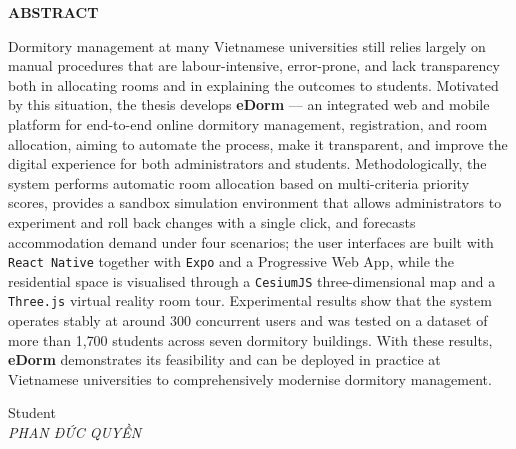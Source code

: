 \documentclass[../DoAn.tex]{subfiles}
\begin{document}
\begin{center}
    {\bfseries\fontsize{18pt}{22pt}\selectfont ABSTRACT}
\end{center}
\vspace{1.5cm}

Dormitory management at many Vietnamese universities still relies largely on
manual procedures that are labour-intensive, error-prone, and lack transparency
both in allocating rooms and in explaining the outcomes to students. Motivated by
this situation, the thesis develops \textbf{eDorm} --- an integrated web and
mobile platform for end-to-end online dormitory management, registration, and
room allocation, aiming to automate the process, make it transparent, and improve
the digital experience for both administrators and students. Methodologically, the
system performs automatic room allocation based on multi-criteria priority scores,
provides a sandbox simulation environment that allows administrators to experiment
and roll back changes with a single click, and forecasts accommodation demand
under four scenarios; the user interfaces are built with \texttt{React Native}
together with \texttt{Expo} and a Progressive Web App, while the residential space
is visualised through a \texttt{CesiumJS} three-dimensional map and a
\texttt{Three.js} virtual reality room tour. Experimental results show that the
system operates stably at around 300 concurrent users and was tested on a dataset
of more than 1{,}700 students across seven dormitory buildings. With these results,
\textbf{eDorm} demonstrates its feasibility and can be deployed in practice at
Vietnamese universities to comprehensively modernise dormitory management.

\vspace{2cm}
\begin{flushright}
    Student\\[4pt]
    {\itshape PHAN ĐỨC QUYỀN}
\end{flushright}
\end{document}
